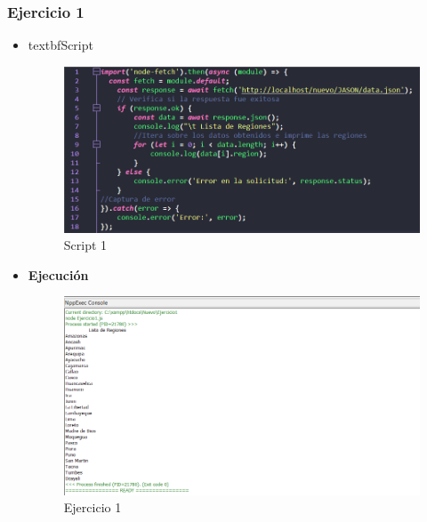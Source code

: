 \documentclass{article}
\begin{document}
	\subsubsection{Ejercicio 1}
	\begin{itemize}
		\item textbf{Script}
		\begin{figure}[H]
			\centering
			\includegraphics[width=1\textwidth,keepaspectratio]{img/Script1.png}
			\caption{Script 1}
		\end{figure}
		\newpage
		\item \textbf{Ejecución}
		\begin{figure}[H]
			\centering
			\includegraphics[width=1\textwidth,keepaspectratio]{img/Ejecucion1.png}
			\caption{Ejercicio 1}
		\end{figure}
	\end{itemize}
\end{document}
